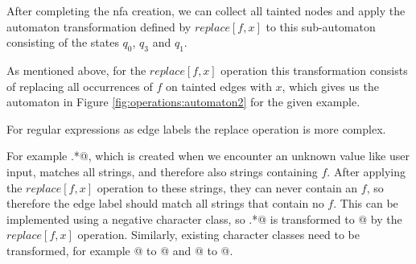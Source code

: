 After completing the \ac{nfa} creation, we can collect all tainted nodes and apply the automaton transformation defined by $replace[f,x]$ to this sub-automaton consisting of the states $q_0$, $q_3$ and $q_1$.

As mentioned above, for the $replace[f,x]$ operation this transformation consists of replacing all occurrences of $f$ on tainted edges with $x$, which gives us the automaton in Figure \ref{fig:operations:automaton2} for the given example.

For regular expressions as edge labels the replace operation is more complex.

For example \Verb@.*@, which is created when we encounter an unknown value like user input, matches all strings, and therefore also strings containing $f$. After applying the $replace[f,x]$ operation to these strings, they can never contain an $f$, so therefore the edge label should match all strings that contain no $f$. This can be implemented using a negative character class, so \Verb@.*@ is transformed to \Verb@[^f]@ by the $replace[f,x]$ operation. Similarly, existing character classes need to be transformed, for example \Verb@[abf]@ to \Verb@[abx]@ and \Verb@[^ab]@ to \Verb@[^abf]@.

